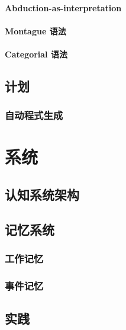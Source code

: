 \documentclass[12pt, a4paper]{report}
\newcommand{\cc}[2]{#1}
\newcommand{\cc}[2]{#2}
\theoremstyle{examples} \newtheorem{example}{Example}[section]
\begin{document}
		\subsection{\cc{Abduction-as-interpretation}{Abduction as interpretation}}
		\subsection{\cc{Montague 语法}{Montague grammar}}
		\subsection{\cc{Categorial 语法}{Categorial grammar}}

\chapter{\cc{计划}{Planning}}

	\section{\cc{自动程式生成}{Program synthesis}}


\part{\cc{系统}{Architecture}}

\chapter{\cc{认知系统架构}{Cognitive architectures}}

\chapter{\cc{记忆系统}{Memory systems}}

	\section{\cc{工作记忆}{Working memory}}
	
	\section{\cc{事件记忆}{Episodic memory}}
	
\chapter{\cc{实践}{Implementation}}
\end{document}

